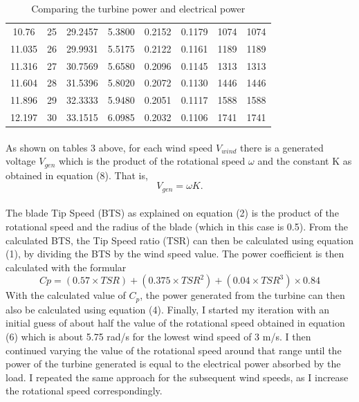 \documentclass[titlepage]{article}
\begin{document}
\begin{table}[h!]
\begin{tabular}{ |c|c|c|c|c|c|c|c| }
10.76&	25&	29.2457&	5.3800&	0.2152&	0.1179&	1074&	1074\\
11.035&	26&	29.9931&	5.5175&	0.2122&	0.1161&	1189&	1189\\
11.316&	27&	30.7569&	5.6580&	0.2096&	0.1145&	1313&	1313\\
11.604&	28&	31.5396&	5.8020&	0.2072&	0.1130&	1446&	1446\\
11.896&	29&	32.3333&	5.9480&	0.2051&	0.1117&	1588&	1588\\
12.197&	30&	33.1515&	6.0985&	0.2032&	0.1106&	1741&	1741\\
\hline
\end{tabular}
\caption{Comparing the turbine power and electrical power}
\label{table:1}
\end{table}
\paragraph{}As shown on tables 3 above, for each wind speed $V_{wind}$ there is a generated voltage $V_{gen}$ which is the product of the rotational speed $\omega$ and the constant K as obtained in equation (8). That is, 
\begin{equation}\label{}
V_{gen} = \omega K.
\end{equation}
\paragraph{}The blade Tip Speed (BTS) as explained on equation (2) is the product of the rotational speed and the radius of the blade (which in this case is 0.5). From the calculated BTS, the Tip Speed ratio (TSR) can then be calculated using equation (1), by dividing the BTS by the wind speed value. The power coefficient is then calculated with the formular 
\begin{equation}\label{}
C{p} = (0.57 \times TSR) + (0.375 \times TSR^2) + (0.04 \times TSR^3) \times 0.84
\end{equation}
With the calculated value of $C_{p}$, the power generated from the turbine can then also be calculated using equation (4). Finally, I started my iteration with an initial guess of about half the value of the rotational speed obtained in equation (6) which is about 5.75 rad/s for the lowest wind speed of 3 m/s. I then continued varying the value of the rotational speed around that range until the power of the turbine generated is equal to the electrical power absorbed by the load. I repeated the same approach for the subsequent wind speeds, as I increase the rotational speed correspondingly. 
\end{document}
